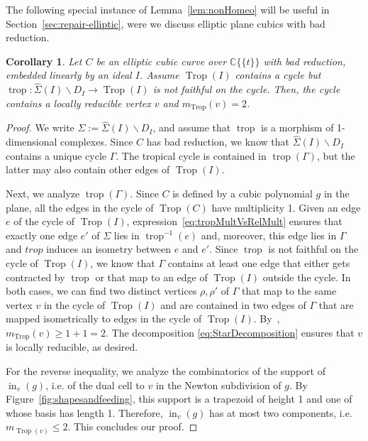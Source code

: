\documentclass[11pt]{amsart}
\numberwithin{equation}{section}
\theoremstyle{plain}
\newtheorem{corollary}[theorem]{Corollary}
\theoremstyle{definition}
\theoremstyle{remark}
\begin{document}
The following special instance of Lemma~\ref{lem:nonHomeo} will be
useful in Section~\ref{sec:repair-elliptic}, were we discuss elliptic
plane cubics with bad reduction.
\begin{corollary}\label{cor:nonHomeoCycle}
  Let $C$ be an elliptic cubic curve over ${{\mathbb{C}}\{\!\{t
\}\!\}}$ with bad reduction,
  embedded linearly by an ideal $I$. Assume $\operatorname{Trop}(I)$ contains a
  cycle but $\operatorname{trop}\colon \widehat{\Sigma}(I)\smallsetminus D_I\to
  \operatorname{Trop}(I)$ is not faithful on the cycle. Then, the cycle contains a
  locally reducible vertex $v$ and $m_\operatorname{Trop}(v)= 2$.
\end{corollary}
\begin{proof}
  We write $\Sigma:=\widehat{\Sigma}(I)\smallsetminus D_I$, and assume
  that $\operatorname{trop}$ is a morphism of 1-dimensional complexes.  Since $C$
  has bad reduction, we know that $\widehat{\Sigma}(I)\smallsetminus
  D_I$ contains a unique cycle $\Gamma$. The tropical cycle is
  contained in $\operatorname{trop}(\Gamma)$, but the latter may also contain other
  edges of $\operatorname{Trop}(I)$.

  Next, we analyze $\operatorname{trop}(\Gamma)$. Since $C$ is defined by a cubic
  polynomial $g$ in the plane, all the edges in the cycle of
  $\operatorname{Trop}(C)$ have multiplicity 1. Given an edge $e$ of the cycle of
  $\operatorname{Trop}(I)$, expression~\eqref{eq:tropMultVsRelMult} ensures that
  exactly one edge $e'$ of $\Sigma$ lies in $\operatorname{trop}^{-1}(e)$ and,
  moreover, this edge lies in $\Gamma$ and $trop$ induces an isometry
  between $e$ and $e'$. Since $\operatorname{trop}$ is not faithful on the cycle of
  $\operatorname{Trop}(I)$, we know that $\Gamma$ contains at least one edge that
  either gets contracted by $\operatorname{trop}$ or that map to an edge of
  $\operatorname{Trop}(I)$ outside the cycle. In both cases, we can find two
  distinct vertices $\rho, \rho'$ of $\Gamma$ that map to the same
  vertex $v$ in the cycle of $\operatorname{Trop}(I)$ and are contained in two edges
  of $\Gamma$ that are mapped isometrically to edges in the cycle of
  $\operatorname{Trop}(I)$. By~\cite[Corollary 6.12]{BPR11}, $m_\operatorname{Trop}(v)\geq
  1+1=2$.  The decomposition \eqref{eq:StarDecomposition} ensures that
  $v$ is locally reducible, as desired.

For the reverse inequality, we analyze the combinatorics of the
support of $\operatorname{in}_{v}(g)$, i.e. of the dual cell to $v$ in the Newton subdivision of $g$. By Figure~\ref{fig:shapesandfeeding}, this
support is a trapezoid of height 1 and one of whose basis has length
1. Therefore, $\operatorname{in}_{v}(g)$ has at most two components, i.e.\
$m_{\operatorname{Trop}(v)}\leq 2$. This concludes our proof.
\end{proof}
\end{document}
